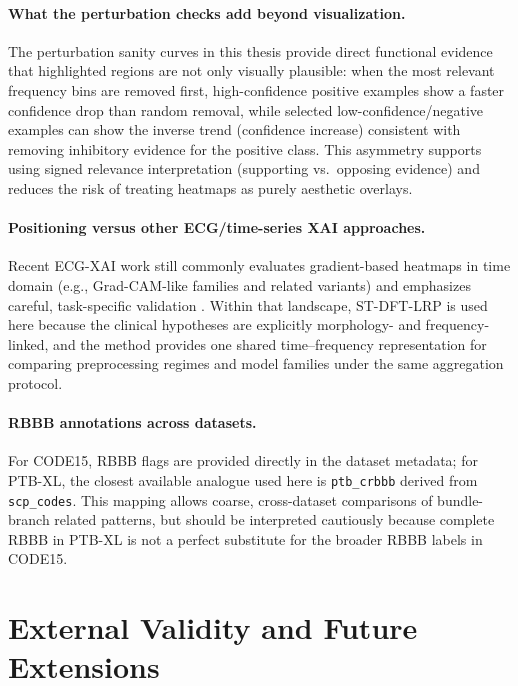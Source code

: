 \paragraph{What the perturbation checks add beyond visualization.}
The perturbation sanity curves in this thesis provide direct functional evidence that highlighted regions are not only visually plausible: when the most relevant frequency bins are removed first, high-confidence positive examples show a faster confidence drop than random removal, while selected low-confidence/negative examples can show the inverse trend (confidence increase) consistent with removing inhibitory evidence for the positive class.
This asymmetry supports using signed relevance interpretation (supporting vs.\ opposing evidence) and reduces the risk of treating heatmaps as purely aesthetic overlays.

\paragraph{Positioning versus other ECG/time-series XAI approaches.}
Recent ECG-XAI work still commonly evaluates gradient-based heatmaps in time domain (e.g., Grad-CAM-like families and related variants) and emphasizes careful, task-specific validation \parencite{hammer_jamia_2025_ecg_xai,xai_cardiology_review_2024}.
Within that landscape, ST-DFT-LRP is used here because the clinical hypotheses are explicitly morphology- and frequency-linked, and the method provides one shared time--frequency representation for comparing preprocessing regimes and model families under the same aggregation protocol.

\paragraph{RBBB annotations across datasets.}
For CODE15, RBBB flags are provided directly in the dataset metadata; for PTB-XL, the closest available analogue used here is \texttt{ptb\_crbbb} derived from \texttt{scp\_codes}.
This mapping allows coarse, cross-dataset comparisons of bundle-branch related patterns, but should be interpreted cautiously because complete RBBB in PTB-XL is not a perfect substitute for the broader RBBB labels in CODE15.

\section{External Validity and Future Extensions}

